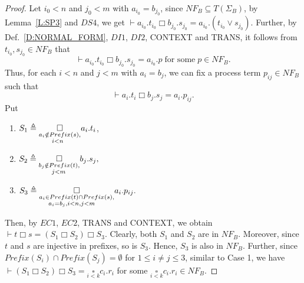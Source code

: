 \documentclass{elsarticle}
\theoremstyle{plain}
\theoremstyle{definition}
\begin{document}
\begin{proof}
  Let $i_0<n$ and $j_0<m$ with $a_{i_0} = b_{j_0}$, since $NF_B \subseteq T(\Sigma_B)$, by Lemma~\ref{L:SP3} and $DS4$, we get $\vdash a_{i_0}.t_{i_0} \Box b_{j_0}.s_{j_0} = a_{i_0}.(t_{i_0} \vee s_{j_0})$.
  Further, by Def.~\ref{D:NORMAL_FORM}, $DI1$, $DI2$, CONTEXT and TRANS, it follows from $t_{i_0},s_{j_0}\in NF_B$ that
  \[\vdash a_{i_0}.t_{i_0} \Box b_{j_0}.s_{j_0} = a_{i_0}.p\;\text{for some}\;p\in NF_B.\]
  Thus, for each $i<n$ and $j<m$ with $a_i = b_j$, we can fix a process term $p_{ij}\in NF_B$ such that
  \[\vdash a_i.t_i \Box b_j.s_j = a_i.p_{ij}.\]
  Put
    \begin{enumerate}
      \item  $S_1 \triangleq \underset{ \begin{subarray} \;a_i \notin Prefix(s),\\\;\;\;\;\;\;\;i<n\end{subarray}}{\square}a_i.t_i$,
      \item  $ S_2 \triangleq \underset{ \begin{subarray} \;b_j \notin Prefix(t),\\\;\;\;\;\;\;\;j<m\end{subarray}}{\square}b_j.s_j,$
      \item $S_3 \triangleq \underset{\begin{subarray} \;a_i \in Prefix(t)\cap Prefix(s),\\\;\;\;\;\;a_i = b_j,i<n,j<m\end{subarray}
       }{\square}a_i.p_{ij}.$
    \end{enumerate}
    Then, by $EC1$, $EC2$, TRANS and CONTEXT, we obtain $\vdash t \Box s = (S_1 \Box S_2)\Box S_3$.
    Clearly, both $S_1$ and $S_2$ are in $NF_B$.
    Moreover, since $t$ and $s$ are injective in prefixes, so is $S_3$.
    Hence, $S_3$ is also in $NF_B$.
    Further, since $Prefix(S_i)\cap Prefix(S_j) = \emptyset$ for $1 \leq i \neq j \leq 3$, similar to Case 1, we have
    $\vdash (S_1 \Box S_2)\Box S_3 = \underset{i<k}\square c_i.r_i$ for some $\underset{i<k}\square c_i.r_i \in NF_B$.
\end{proof}
\end{document}
